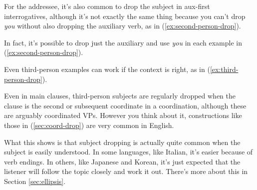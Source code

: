 \ea  \label{ex:first-person-drop}
    \z
\z

For the addressee, it's also common to drop the subject in aux-first interrogatives, although it's not exactly the same thing because you can't drop \textit{you} without also dropping the auxiliary verb, as in (\ref{ex:second-person-drop}).

\ea  \label{ex:second-person-drop}
    \z
\z

In fact, it's possible to drop just the auxiliary and use \textit{you} in each example in (\ref{ex:second-person-drop}).

Even third-person examples can work if the context is right, as in (\ref{ex:third-person-drop}).
\ea  \label{ex:third-person-drop}
    \z
\z

Even in main clauses, third-person subjects are regularly dropped when the clause is the second or subsequent coordinate in a coordination, although these are arguably coordinated VPs. However you think about it, constructions like those in (\ref{sec:coord-drop}) are very common in English.

\ea \label{sec:coord-drop}
    \z
\z

What this shows is that subject dropping is actually quite common when the subject is easily understood. In some languages, like Italian, it's easier because of verb endings. In others, like Japanese and Korean, it's just expected that the listener will follow the topic closely and work it out. There's more about this in  Section \ref{sec:ellipsis}.


